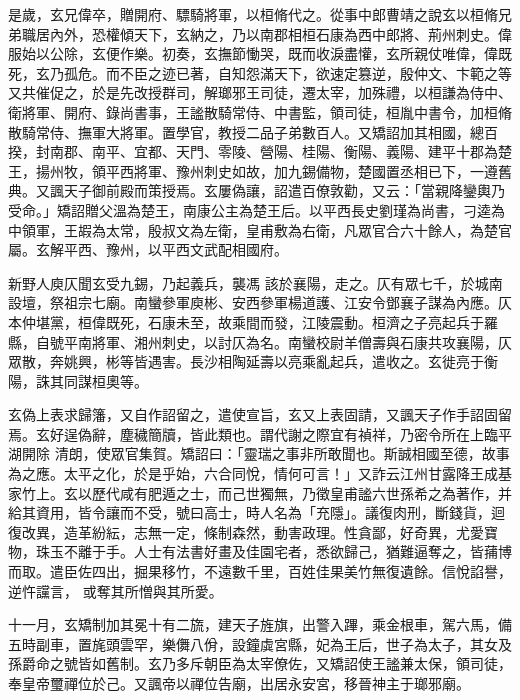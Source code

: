 \begin{pinyinscope}
 是歲，玄兄偉卒，贈開府、驃騎將軍，以桓脩代之。從事中郎曹靖之說玄以桓脩兄弟職居內外，恐權傾天下，玄納之，乃以南郡相桓石康為西中郎將、荊州刺史。偉服始以公除，玄便作樂。初奏，玄撫節慟哭，既而收淚盡懽，玄所親仗唯偉，偉既死，玄乃孤危。而不臣之迹已著，自知怨滿天下，欲速定篡逆，殷仲文、卞範之等又共催促之，於是先改授群司，解瑯邪王司徒，遷太宰，加殊禮，以桓謙為侍中、衛將軍、開府、錄尚書事，王謐散騎常侍、中書監，領司徒，桓胤中書令，加桓脩
 散騎常侍、撫軍大將軍。置學官，教授二品子弟數百人。又矯詔加其相國，總百揆，封南郡、南平、宜都、天門、零陵、營陽、桂陽、衡陽、義陽、建平十郡為楚王，揚州牧，領平西將軍、豫州刺史如故，加九錫備物，楚國置丞相已下，一遵舊典。又諷天子御前殿而策授焉。玄屢偽讓，詔遣百僚敦勸，又云：「當親降鑾輿乃受命。」矯詔贈父溫為楚王，南康公主為楚王后。以平西長史劉瑾為尚書，刁逵為中領軍，王嘏為太常，殷叔文為左衛，皇甫敷為右衛，凡眾官合六十餘人，為楚官屬。玄解平西、豫州，以平西文武配相國府。



 新野人庾仄聞玄受九錫，乃起義兵，襲馮
 該於襄陽，走之。仄有眾七千，於城南設壇，祭祖宗七廟。南蠻參軍庾彬、安西參軍楊道護、江安令鄧襄子謀為內應。仄本仲堪黨，桓偉既死，石康未至，故乘間而發，江陵震動。桓濟之子亮起兵于羅縣，自號平南將軍、湘州刺史，以討仄為名。南蠻校尉羊僧壽與石康共攻襄陽，仄眾散，奔姚興，彬等皆遇害。長沙相陶延壽以亮乘亂起兵，遣收之。玄徙亮于衡陽，誅其同謀桓奧等。



 玄偽上表求歸籓，又自作詔留之，遣使宣旨，玄又上表固請，又諷天子作手詔固留焉。玄好逞偽辭，塵穢簡牘，皆此類也。謂代謝之際宜有禎祥，乃密令所在上臨平湖開除
 清朗，使眾官集賀。矯詔曰：「靈瑞之事非所敢聞也。斯誠相國至德，故事為之應。太平之化，於是乎始，六合同悅，情何可言！」又詐云江州甘露降王成基家竹上。玄以歷代咸有肥遁之士，而己世獨無，乃徵皇甫謐六世孫希之為著作，并給其資用，皆令讓而不受，號曰高士，時人名為「充隱」。議復肉刑，斷錢貨，迴復改異，造革紛紜，志無一定，條制森然，動害政理。性貪鄙，好奇異，尤愛寶物，珠玉不離于手。人士有法書好畫及佳園宅者，悉欲歸己，猶難逼奪之，皆蒱博而取。遣臣佐四出，掘果移竹，不遠數千里，百姓佳果美竹無復遺餘。信悅諂譽，逆忤讜言，
 或奪其所憎與其所愛。



 十一月，玄矯制加其冕十有二旒，建天子旌旗，出警入蹕，乘金根車，駕六馬，備五時副車，置旄頭雲罕，樂儛八佾，設鐘虡宮縣，妃為王后，世子為太子，其女及孫爵命之號皆如舊制。玄乃多斥朝臣為太宰僚佐，又矯詔使王謐兼太保，領司徒，奉皇帝璽禪位於己。又諷帝以禪位告廟，出居永安宮，移晉神主于瑯邪廟。




\end{pinyinscope}
